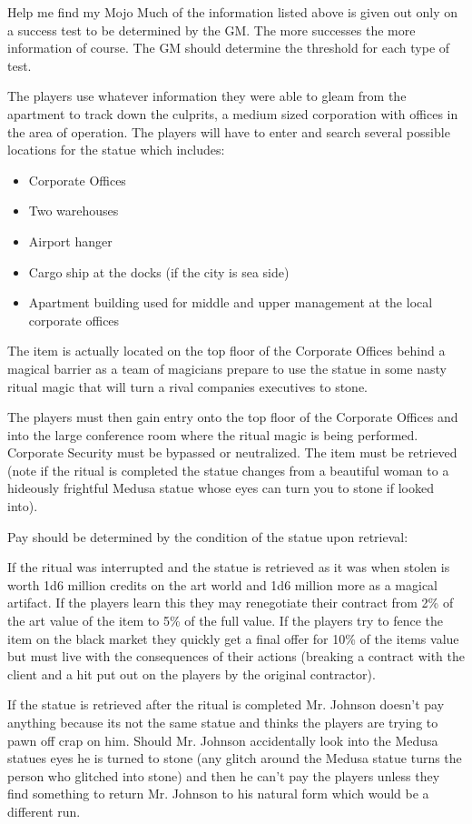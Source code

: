 \begin{scenario}{Help me find my Mojo}
Much of the information listed above is given out only on a success test to be determined by the GM. The more successes the more information of course. The GM should determine the threshold for each type of test.

The players use whatever information they were able to gleam from the apartment to track down the culprits, a medium sized corporation with offices in the area of operation. The players will have to enter and search several possible locations for the statue which includes:

\begin{itemize}
\item    Corporate Offices
\item    Two warehouses
\item    Airport hanger
\item    Cargo ship at the docks (if the city is sea side)
\item    Apartment building used for middle and upper management at the local corporate offices
\end{itemize}


The item is actually located on the top floor of the Corporate Offices behind a magical barrier as a team of magicians prepare to use the statue in some nasty ritual magic that will turn a rival companies executives to stone.

The players must then gain entry onto the top floor of the Corporate Offices and into the large conference room where the ritual magic is being performed. Corporate Security must be bypassed or neutralized. The item must be retrieved (note if the ritual is completed the statue changes from a beautiful woman to a hideously frightful Medusa statue whose eyes can turn you to stone if looked into).

\notes
 Pay should be determined by the condition of the statue upon retrieval:

If the ritual was interrupted and the statue is retrieved as it was when stolen is worth 1d6 million credits on the art world and 1d6 million more as a magical artifact. If the players learn this they may renegotiate their contract from 2\% of the art value of the item to 5\% of the full value. If the players try to fence the item on the black market they quickly get a final offer for 10\% of the items value but must live with the consequences of their actions (breaking a contract with the client and a hit put out on the players by the original contractor).

If the statue is retrieved after the ritual is completed Mr. Johnson doesn't pay anything because its not the same statue and thinks the players are trying to pawn off crap on him. Should Mr. Johnson accidentally look into the Medusa statues eyes he is turned to stone (any glitch around the Medusa statue turns the person who glitched into stone) and then he can't pay the players unless they find something to return Mr. Johnson to his natural form which would be a different run.

\end{scenario}